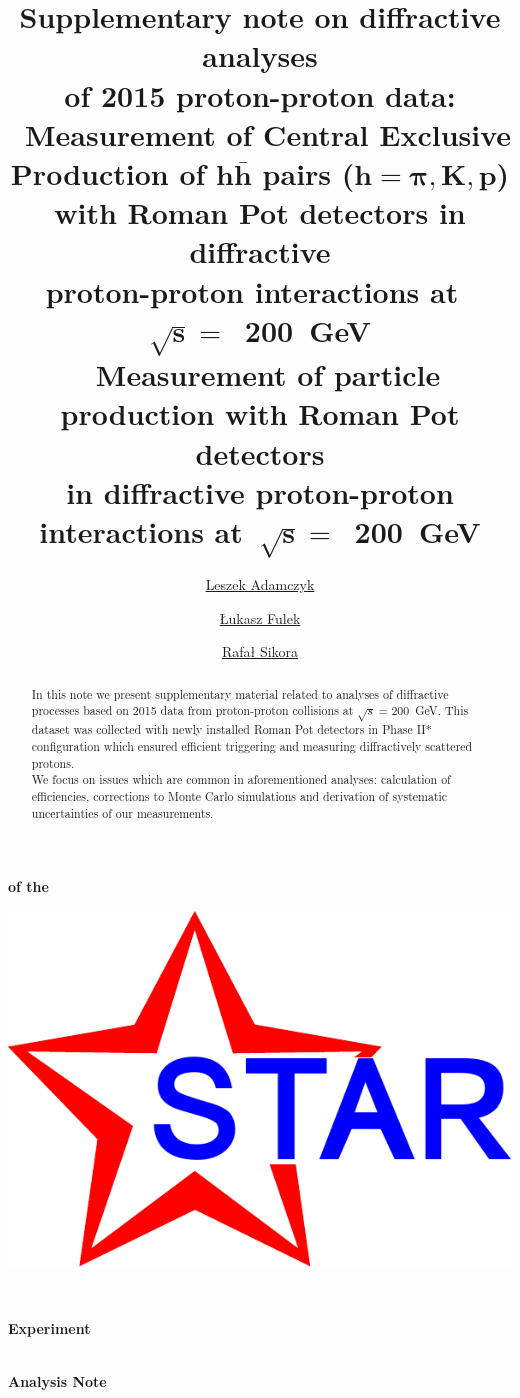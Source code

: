 \documentclass[a4paper,10pt,notitlepage]{report}
\title{\textbf{Supplementary note on diffractive analyses\\of 2015 proton-proton data:\\[20pt]\large{\cite{AnalysisNoteRafal}~Measurement of Central Exclusive Production of $\bm{h\bar{h}}$ pairs ($\bm{h=\pi,K,p}$) with Roman Pot detectors in diffractive\\proton-proton interactions at~$\bm{\sqrt{s}=}$~200~GeV\\[10pt]\cite{AnalysisNoteLukasz}~Measurement of particle production with Roman Pot detectors\\in diffractive proton-proton interactions at~$\bm{\sqrt{s}=}$~200~GeV\\}}\vspace*{10pt}}
\author[ ]{\href{mailto:leszek.adamczyk@agh.edu.pl}{Leszek Adamczyk}}
\author[ ]{\href{mailto:lukasz.fulek@fis.agh.edu.pl}{Łukasz Fulek}}
\author[ ]{\href{mailto:rafal.sikora@fis.agh.edu.pl}{Rafał Sikora}}
\affil[ ]{AGH University of Science and Technology, FPACS, Kraków, Poland}
\begin{document}
\begin{center}
\begin{minipage}[c]{0.12\linewidth}%
\vspace{5.5pt}\textbf{\LARGE{of the}}
\end{minipage}
\begin{minipage}[c]{0.15\linewidth}%
\hspace*{-8pt}\includegraphics[width=\linewidth]{graphics/STAR_logo.pdf}
\end{minipage}~
\begin{minipage}[c]{0.24\linewidth}%
\vspace{9pt}\hspace*{-8pt}\textbf{\LARGE{Experiment}}
\end{minipage}\\[-50pt]
\textbf{\LARGE{Analysis Note}}

\vspace*{125pt}
\begin{minipage}{\linewidth}
\maketitle
\begin{abstract}
In this note we present supplementary material related to analyses of diffractive processes based on 2015 data from proton-proton collisions at $\sqrt{s}=200$~GeV. This dataset was collected with newly installed Roman Pot detectors in Phase II* configuration which ensured efficient triggering and measuring diffractively scattered protons.\\\indent We focus on issues which are common in aforementioned analyses: calculation of efficiencies, corrections to Monte Carlo simulations and derivation of systematic uncertainties of our measurements.
\end{abstract}
\thispagestyle{empty}
\end{minipage}


\end{center}
\end{document}
